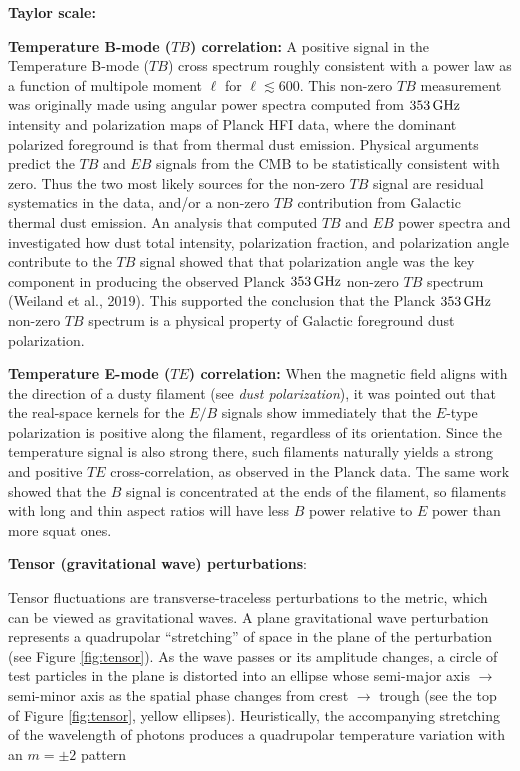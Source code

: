 \documentclass[a4paper,10pt]{article}
\begin{document}
{\noindent}\textbf{Taylor scale:}

{\noindent}\textbf{Temperature B-mode ($TB$) correlation:} A positive signal in the Temperature B-mode ($TB$) cross spectrum roughly consistent with a power law as a function of multipole moment $\ell$ for $\ell\lesssim600$. This non-zero $TB$ measurement was originally made using angular power spectra computed from $353\,{\rm GHz}$ intensity and polarization maps of Planck HFI data, where the dominant polarized foreground is that from thermal dust emission. Physical arguments predict the $TB$ and $EB$ signals from the CMB to be statistically consistent with zero. Thus the two most likely sources for the non-zero $TB$ signal are residual systematics in the data, and/or a non-zero $TB$ contribution from Galactic thermal dust emission. An analysis that computed $TB$ and $EB$ power spectra and investigated how dust total intensity, polarization fraction, and polarization angle contribute to the $TB$ signal showed that that polarization angle was the key component in producing the observed Planck $353\,{\rm GHz}$ non-zero $TB$ spectrum (Weiland et al., 2019). This supported the conclusion that the Planck $353\,{\rm GHz}$ non-zero $TB$ spectrum is a physical property of Galactic foreground dust polarization.

{\noindent}\textbf{Temperature E-mode ($TE$) correlation:} When the magnetic field aligns with the direction of a dusty filament (see \textit{dust polarization}), it was pointed out that the real-space kernels for the $E/B$ signals show immediately that the $E$-type polarization is positive along the filament, regardless of its orientation. Since the temperature signal is also strong there, such filaments naturally yields a strong and positive $TE$ cross-correlation, as observed in the Planck data. The same work showed that the $B$ signal is concentrated at the ends of the filament, so filaments with long and thin aspect ratios will have less $B$ power relative to $E$ power than more squat ones.

{\noindent}\textbf{Tensor (gravitational wave) perturbations}:

{\noindent}Tensor fluctuations are transverse-traceless perturbations to the metric, which can be viewed as gravitational waves. A plane gravitational wave perturbation represents a quadrupolar ``stretching'' of space in the plane of the perturbation (see Figure \ref{fig:tensor}). As the wave passes or its amplitude changes, a circle of test particles in the plane is distorted into an ellipse whose semi-major axis $\rightarrow$ semi-minor axis as the spatial phase changes from crest $\rightarrow$ trough (see the top of Figure \ref{fig:tensor}, yellow ellipses). Heuristically, the accompanying stretching of the wavelength of photons produces a quadrupolar temperature variation with an $m=\pm2$ pattern
\end{document}
